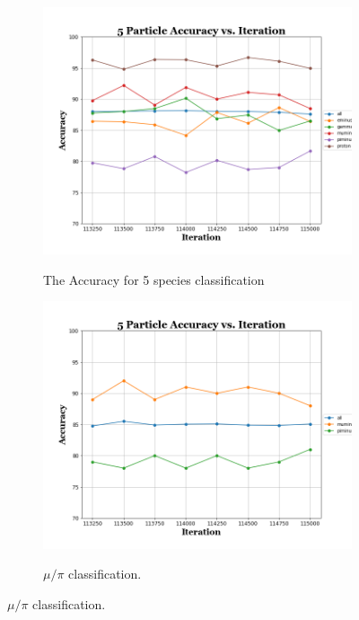 \documentclass[11pt,a4paper]{article}
\begin{document}
\begin{figure}[t]
  \centering  
\begin{subfigure}[t]{0.45\textwidth}
\centering
\includegraphics[width=\textwidth]{Figures/part5_vggb.png}
\label{a}
\caption{The Accuracy for 5 species classification}
\end{subfigure}%
\hfill
\begin{subfigure}[t]{0.45\textwidth}
\centering
\includegraphics[width=\textwidth]{Figures/part_mu-pi_vggb.png}
\label{b}
\caption{$\mu/\pi$ classification.}
\end{subfigure}%


\end{figure}
\end{document}
